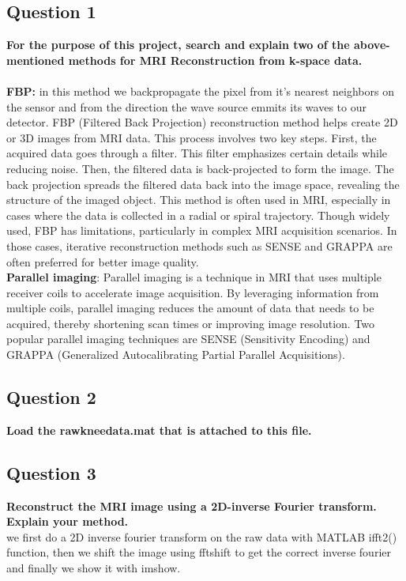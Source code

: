 \documentclass[11pt]{article}
\begin{document}
\subsection{Question 1}
\textbf{For the purpose of this project, search and explain two of the above-mentioned methods
for MRI Reconstruction from k-space data.} \\
\vspace{0.2cm} \\
\textbf{FBP:} in this method we backpropagate the pixel from it's nearest neighbors
on the sensor and from the direction the wave source emmits its waves to our detector.
FBP (Filtered Back Projection) reconstruction method helps create 2D or 3D images from MRI data. This process involves two key steps. First, 
the acquired data goes through a filter. This filter emphasizes certain 
details while reducing noise. Then, the filtered data is back-projected to form the image. The back projection spreads
the filtered data back into the image space, revealing the structure of the imaged object. This method is often used in 
MRI, especially in cases where the data is collected in a radial or spiral trajectory. Though widely used, FBP has limitations, particularly 
in complex MRI acquisition scenarios. In those cases, iterative reconstruction methods such as SENSE and GRAPPA are often preferred for better image quality.
\vspace{1cm} \\
\textbf{Parallel imaging}: Parallel imaging is a technique in MRI that uses multiple receiver coils to accelerate 
image acquisition. By leveraging information from multiple coils, parallel imaging reduces 
the amount of data that needs to be acquired, thereby shortening scan times or 
improving image resolution. Two popular parallel imaging techniques are SENSE (Sensitivity Encoding) 
and GRAPPA (Generalized Autocalibrating Partial Parallel Acquisitions).


\subsection{Question 2}
\textbf{Load the rawkneedata.mat that is attached to this file.} \\

\subsection{Question 3}
\textbf{Reconstruct the MRI image using a 2D-inverse Fourier transform. Explain your method.}\\

we first do a 2D inverse fourier transform on the raw data with MATLAB ifft2() function,
then we shift the image using fftshift to get the correct inverse fourier and finally we show it with imshow.
\end{document}
